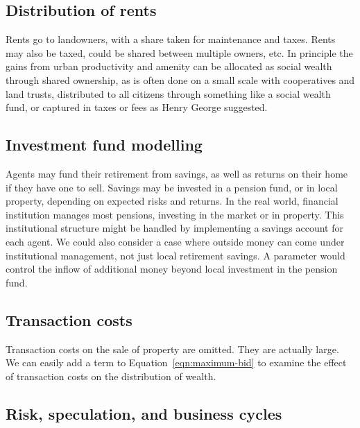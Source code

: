 \subsection{Distribution of rents}
Rents go to landowners, with a share taken for maintenance and taxes.
Rents may also be taxed, could be shared between multiple owners, etc.
In principle the gains from urban productivity and amenity can be allocated as social wealth through shared ownership, as is often done on a small scale with cooperatives and land trusts, distributed to all citizens through something like a social wealth fund, or captured in taxes or fees as Henry George suggested. 



\subsection{Investment fund modelling}
Agents may fund their retirement from savings, as well as returns on their home if they have one to sell. Savings may be invested in a pension fund, or in local property,  depending on expected risks and returns. In the real world, financial institution manages most pensions, investing in the market or in property.  This institutional structure might be handled by implementing a savings account for each agent. %
We could also consider a case where outside money can come under institutional management, not just local retirement savings. A parameter would control the inflow of additional money beyond local investment in the pension fund. 

\subsection{Transaction costs}
Transaction costs on the sale of property are omitted. They are actually large. We can easily add a term to  Equation~\ref{eqn:maximum-bid} to examine the effect of transaction costs on the distribution of wealth.


\subsection{Risk, speculation, and business cycles}

